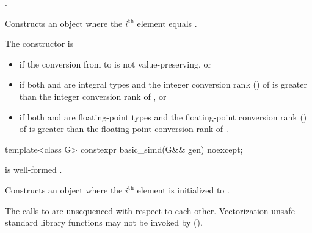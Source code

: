 \begin{itemdescr}
  \pnum\constraints
  .

  \pnum\effects
  Constructs an object where the $i^\text{th}$ element equals  \foralli.

  \pnum\remarks
  The constructor is 
  \begin{itemize}
    \item if the conversion from  to  is not
      value-preserving, or

    \item if both  and  are integral types and the
      integer conversion rank () of  is greater than
      the integer conversion rank of , or

    \item if both  and  are floating-point types and
      the floating-point conversion rank () of  is
      greater than the floating-point conversion rank of .
  \end{itemize}
\end{itemdescr}

\begin{itemdecl}
template<class G> constexpr basic_simd(G&& gen) noexcept;
\end{itemdecl}

\begin{itemdescr}
  \pnum\constraints
   is well-formed \foralli.

  \pnum\effects
  Constructs an object where the $i^\text{th}$ element is initialized to .

  \pnum
  The calls to  are unsequenced with respect to each other. Vectorization-unsafe standard library functions may not be invoked by  ().
\end{itemdescr}

\newcommand\SimdLoadDescr[2]{
  \pnum\constraints
  \begin{itemize}
    \item \tcode{iter_value_t<It>} is a vectorizable type, and
    \item \tcode{It} satisfies \tcode{contiguous_iterator}.
  \end{itemize}

  \pnum\mandates
  \conversionFlagsMandate{iter_value_t<It>}{value_type}

  \pnum\expects
  \begin{itemize}
    \item #1
    \item \tcode{It} models \tcode{contiguous_iterator}.
    \flagsRequires{basic_simd, iter_value_t<It>}{iter_value_t<It>}
  \end{itemize}

  \pnum\effects #2

  \pnum\throws Nothing.
}

